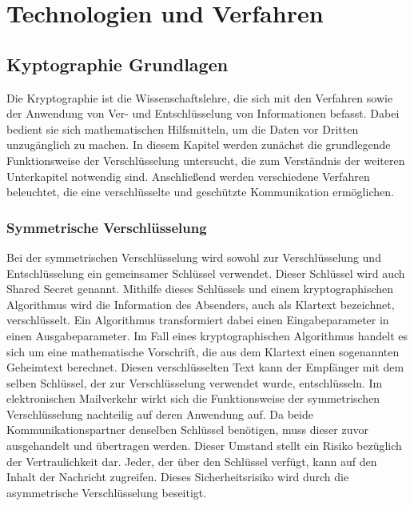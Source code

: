 \documentclass  [paper=a4,
				fontsize=12pt,
				listof=totoc,
				bibliography=totoc
				]{scrreprt}
\begin{document}
	\chapter{Technologien und Verfahren}
		\section{Kyptographie Grundlagen}
				Die Kryptographie ist die Wissenschaftslehre, die sich mit den Verfahren sowie der Anwendung von Ver- und Entschlüsselung von Informationen befasst. Dabei bedient sie sich mathematischen Hilfsmitteln, um die Daten vor Dritten unzugänglich zu machen. In diesem Kapitel werden zunächst die grundlegende Funktionsweise der Verschlüsselung untersucht, die zum Verständnis der weiteren Unterkapitel notwendig sind. Anschließend werden verschiedene Verfahren beleuchtet, die eine verschlüsselte und geschützte Kommunikation ermöglichen.
			\subsection{Symmetrische Verschlüsselung}
				Bei der symmetrischen Verschlüsselung wird sowohl zur Verschlüsselung und Entschlüsselung ein gemeinsamer Schlüssel verwendet. Dieser Schlüssel wird auch Shared Secret genannt. Mithilfe dieses Schlüssels und einem kryptographischen Algorithmus wird die Information des Absenders, auch als Klartext bezeichnet, verschlüsselt. Ein Algorithmus transformiert dabei einen Eingabeparameter in einen Ausgabeparameter. Im Fall eines kryptographischen Algorithmus handelt es sich um eine mathematische Vorschrift, die aus dem Klartext einen sogenannten Geheimtext berechnet. Diesen verschlüsselten Text kann der Empfänger mit dem selben Schlüssel, der zur Verschlüsselung verwendet wurde, entschlüsseln.
				Im elektronischen Mailverkehr wirkt sich die Funktionsweise der symmetrischen Verschlüsselung nachteilig auf deren Anwendung auf. Da beide Kommunikationspartner denselben Schlüssel benötigen, muss dieser zuvor ausgehandelt und übertragen werden. Dieser Umstand stellt ein Risiko bezüglich der Vertraulichkeit dar. Jeder, der über den Schlüssel verfügt, kann auf den Inhalt der Nachricht zugreifen. Dieses Sicherheitsrisiko wird durch die asymmetrische Verschlüsselung beseitigt.
\end{document}
